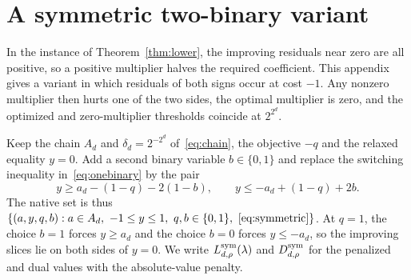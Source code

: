 \section{A symmetric two-binary variant}\label{app:symmetric}
In the instance of Theorem~\ref{thm:lower}, the improving residuals near
zero are all positive, so a positive multiplier halves the required
coefficient. This appendix gives a variant in which residuals of both
signs occur at cost $-1$. Any nonzero multiplier then hurts one of the two
sides, the optimal multiplier is zero, and the optimized and
zero-multiplier thresholds coincide at $2^{2^d}$.

Keep the chain $A_d$ and $\delta_d=2^{-2^d}$ of~\eqref{eq:chain}, the
objective $-q$ and the relaxed equality $y=0$. Add a second binary
variable $b\in\{0,1\}$ and replace the switching inequality
in~\eqref{eq:onebinary} by the pair
\begin{equation}\label{eq:symmetric}
 y\ge a_d-(1-q)-2(1-b),\qquad
 y\le-a_d+(1-q)+2b.
\end{equation}
The native set is thus
$\{(a,y,q,b):a\in A_d,\ -1\le y\le1,\ q,b\in\{0,1\},\ \eqref{eq:symmetric}\}$.
At $q=1$, the choice $b=1$ forces $y\ge a_d$ and the choice $b=0$ forces
$y\le-a_d$, so the improving slices lie on both sides of $y=0$. We write
$L^{\rm sym}_{d,\rho}(\lambda)$ and $D^{\rm sym}_{d,\rho}$ for the
penalized and dual values with the absolute-value penalty.

